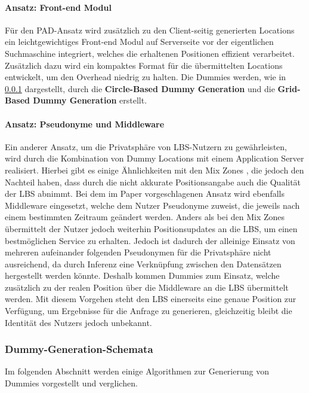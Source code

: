 \paragraph{Ansatz: Front-end Modul \cite{Lu2008}} \label{para:modul}
Für den PAD-Ansatz wird zusätzlich zu den Client-seitig generierten Locations ein leichtgewichtiges Front-end Modul auf Serverseite vor der eigentlichen Suchmaschine integriert, welches die erhaltenen Positionen effizient verarbeitet. Zusätzlich dazu wird ein kompaktes Format für die übermittelten Locations entwickelt, um den Overhead niedrig zu halten. Die Dummies werden, wie in \ref{subsubsection:dgschema} dargestellt, durch die \textbf{Circle-Based Dummy Generation} und die \textbf{Grid-Based Dummy Generation} erstellt.

\paragraph{Ansatz: Pseudonyme und Middleware \cite{Sahu2012}} \label{para:middle}
Ein anderer Ansatz, um die Privatsphäre von LBS-Nutzern zu gewährleisten, wird durch die Kombination von Dummy Locations mit einem Application Server realisiert. Hierbei gibt es einige Ähnlichkeiten mit den Mix Zones \cite{Beresford2003}, die jedoch den Nachteil haben, dass durch die nicht akkurate Positionsangabe auch die Qualität der LBS abnimmt. Bei dem im Paper vorgeschlagenen Ansatz wird ebenfalls Middleware eingesetzt, welche dem Nutzer Pseudonyme zuweist, die jeweils nach einem bestimmten Zeitraum geändert werden. Anders als bei den Mix Zones übermittelt der Nutzer jedoch weiterhin Positionsupdates an die LBS, um einen bestmöglichen Service zu erhalten. Jedoch ist dadurch der alleinige Einsatz von mehreren aufeinander folgenden Pseudonymen für die Privatsphäre nicht ausreichend, da durch Inferenz eine Verknüpfung zwischen den Datensätzen hergestellt werden könnte. Deshalb kommen Dummies zum Einsatz, welche zusätzlich zu der realen Position über die Middleware an die LBS übermittelt werden. Mit diesem Vorgehen steht den LBS einerseits eine genaue Position zur Verfügung, um Ergebnisse für die Anfrage zu generieren, gleichzeitig bleibt die Identität des Nutzers jedoch unbekannt.

\subsubsection{Dummy-Generation-Schemata} \label{subsubsection:dgschema}
Im folgenden Abschnitt werden einige Algorithmen zur Generierung von Dummies vorgestellt und verglichen.

